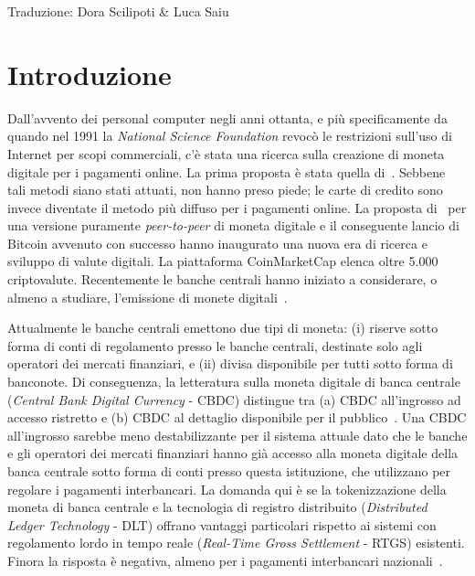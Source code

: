 \documentclass{article}
\begin{document}
Traduzione: Dora Scilipoti \& Luca Saiu
\newpage


\section{Introduzione}\label{1.-introduzione}

Dall'avvento dei personal computer negli anni ottanta, e più 
specificamente da quando nel 1991 la \textit{National Science 
Foundation} revocò le restrizioni sull'uso di Internet per scopi 
commerciali, c'è stata una ricerca sulla creazione di moneta digitale 
per i pagamenti online. La prima proposta è stata quella 
di~\cite{Chaum1983}. Sebbene tali metodi siano stati attuati, non hanno 
preso piede; le carte di credito sono invece diventate il metodo più 
diffuso per i pagamenti online. La proposta di~\cite{Nakamoto} per una 
versione puramente \textit{peer-to-peer} di moneta digitale e il 
conseguente lancio di Bitcoin avvenuto con successo hanno inaugurato 
una nuova era di ricerca e sviluppo di valute digitali. La piattaforma 
CoinMarketCap elenca oltre 5.000 criptovalute. Recentemente le banche 
centrali hanno iniziato a considerare, o almeno a studiare, 
l'emissione di monete 
digitali~\cite[vedi][]{AuerBoehme,AuerCornelli,Boar,Kiff,Mancini-Griffoli}.

Attualmente le banche centrali emettono due tipi di moneta: (i) 
riserve sotto forma di conti di regolamento presso le banche centrali, 
destinate solo agli operatori dei mercati finanziari, e (ii) divisa 
disponibile per tutti sotto forma di banconote. Di conseguenza, la 
letteratura sulla moneta digitale di banca centrale (\textit{Central Bank 
Digital Currency} - CBDC) distingue tra (a) CBDC all'ingrosso ad 
accesso ristretto e (b) CBDC al dettaglio disponibile per il 
pubblico~\cite[si veda, ad esempio,][]{Bech}. 
Una CBDC all'ingrosso sarebbe meno destabilizzante per il sistema attuale 
dato che le banche e gli operatori dei mercati finanziari hanno già 
accesso alla moneta digitale della banca centrale sotto forma di conti 
presso questa istituzione, che utilizzano per regolare i pagamenti 
interbancari. La domanda qui è se la tokenizzazione della moneta di banca 
centrale e la tecnologia di registro distribuito (\textit{Distributed Ledger 
Technology} - DLT) offrano vantaggi particolari rispetto ai sistemi con 
regolamento lordo in tempo reale (\textit{Real-Time Gross Settlement} - RTGS) 
esistenti. Finora la risposta è negativa, almeno per i pagamenti 
interbancari nazionali~\cite[vedi][]{Chapman}.
\end{document}
